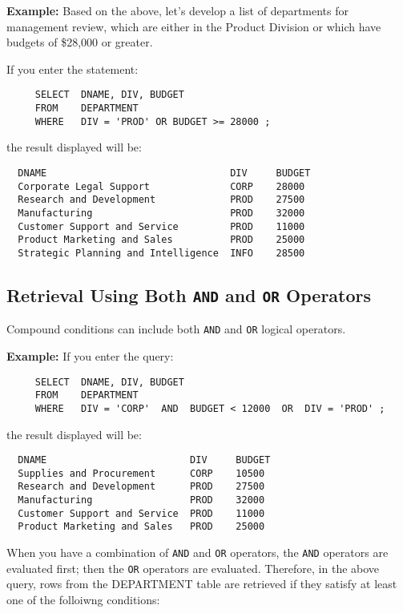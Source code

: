 {\bf Example:}
Based on the above, let's develop a list of departments for management
review, which are either in the Product Division or which have budgets
of \$28,000 or greater.

If you enter the statement:
\begin{verbatim}
     SELECT  DNAME, DIV, BUDGET
     FROM    DEPARTMENT
     WHERE   DIV = 'PROD' OR BUDGET >= 28000 ;
\end{verbatim}
the result displayed will be:

\begin{screen}
\begin{verbatim}
  DNAME                                DIV     BUDGET
  Corporate Legal Support              CORP    28000
  Research and Development             PROD    27500
  Manufacturing                        PROD    32000
  Customer Support and Service         PROD    11000
  Product Marketing and Sales          PROD    25000
  Strategic Planning and Intelligence  INFO    28500
\end{verbatim}
\end{screen}

\subsection{Retrieval Using Both {\tt AND} and {\tt OR} Operators}

Compound conditions can include both {\tt AND} and {\tt OR} logical operators.

{\bf Example:}
If you enter the query:
\begin{verbatim}
     SELECT  DNAME, DIV, BUDGET
     FROM    DEPARTMENT
     WHERE   DIV = 'CORP'  AND  BUDGET < 12000  OR  DIV = 'PROD' ;
\end{verbatim}
the result displayed will be:

\begin{screen}
\begin{verbatim}
  DNAME                         DIV     BUDGET
  Supplies and Procurement      CORP    10500
  Research and Development      PROD    27500
  Manufacturing                 PROD    32000
  Customer Support and Service  PROD    11000
  Product Marketing and Sales   PROD    25000
\end{verbatim}
\end{screen}

When you have a combination of {\tt AND} and {\tt OR} operators, the {\tt AND} operators
are evaluated first; then the {\tt OR} operators are evaluated.  Therefore,
in the above query, rows from the DEPARTMENT table are retrieved if
they satisfy at least one of the folloiwng conditions:

